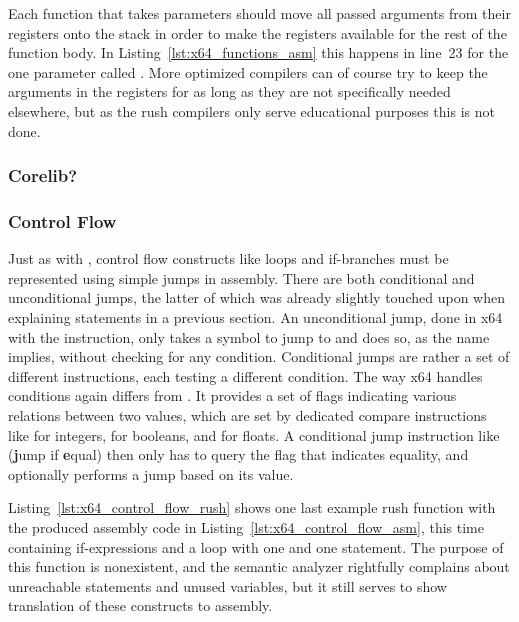 Each function that takes parameters should move all passed arguments from their registers onto the stack in order to make the registers available for the rest of the function body.
In Listing~\ref{lst:x64_functions_asm} this happens in line~23 for the one parameter called .
More optimized compilers can of course try to keep the arguments in the registers for as long as they are not specifically needed elsewhere, but as the rush compilers only serve educational purposes this is not done.

\subsubsection{Corelib?}

\subsubsection{Control Flow}


Just as with \riscv{}, control flow constructs like loops and if-branches must be represented using simple jumps in assembly.
There are both conditional and unconditional jumps, the latter of which was already slightly touched upon when explaining  statements in a previous section.
An unconditional jump, done in x64 with the  instruction, only takes a symbol to jump to and does so, as the name implies, without checking for any condition.
Conditional jumps are rather a set of different instructions, each testing a different condition.
The way x64 handles conditions again differs from \riscv{}.
It provides a set of flags indicating various relations between two values, which are set by dedicated compare instructions like  for integers,  for booleans, and  for floats.
A conditional jump instruction like  (\textbf{j}ump if \textbf{e}qual) then only has to query the flag that indicates equality, and optionally performs a jump based on its value.


Listing~\ref{lst:x64_control_flow_rush} shows one last example rush function with the produced assembly code in Listing~\ref{lst:x64_control_flow_asm}, this time containing if-expressions and a loop with one  and one  statement.
The purpose of this function is nonexistent, and the semantic analyzer rightfully complains about unreachable statements and unused variables, but it still serves to show translation of these constructs to assembly.

